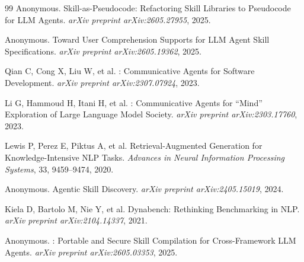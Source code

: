 \documentclass[12pt,a4paper]{ctexart}
\begin{document}
\begin{thebibliography}{99}
Anonymous.
\newblock Skill-as-Pseudocode: Refactoring Skill Libraries to Pseudocode for {LLM} Agents.
\newblock \emph{arXiv preprint arXiv:2605.27955}, 2025.

Anonymous.
\newblock Toward User Comprehension Supports for {LLM} Agent Skill Specifications.
\newblock \emph{arXiv preprint arXiv:2605.19362}, 2025.

Qian C, Cong X, Liu W, et al.
: Communicative Agents for Software Development.
\newblock \emph{arXiv preprint arXiv:2307.07924}, 2023.

Li G, Hammoud H, Itani H, et al.
: Communicative Agents for ``Mind'' Exploration of Large Language Model Society.
\newblock \emph{arXiv preprint arXiv:2303.17760}, 2023.

Lewis P, Perez E, Piktus A, et al.
\newblock Retrieval-Augmented Generation for Knowledge-Intensive {NLP} Tasks.
\newblock \emph{Advances in Neural Information Processing Systems}, 33, 9459--9474, 2020.

Anonymous.
\newblock Agentic Skill Discovery.
\newblock \emph{arXiv preprint arXiv:2405.15019}, 2024.

Kiela D, Bartolo M, Nie Y, et al.
\newblock Dynabench: Rethinking Benchmarking in {NLP}.
\newblock \emph{arXiv preprint arXiv:2104.14337}, 2021.

Anonymous.
: Portable and Secure Skill Compilation for Cross-Framework {LLM} Agents.
\newblock \emph{arXiv preprint arXiv:2605.03353}, 2025.

\end{thebibliography}
\end{document}
